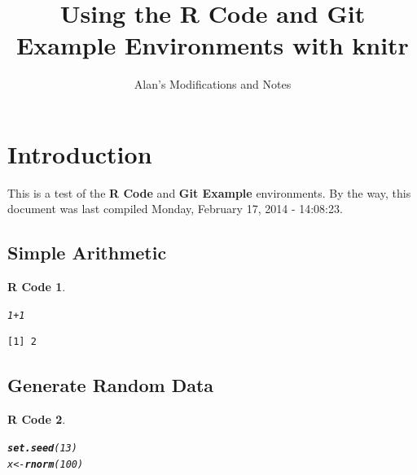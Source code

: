 \documentclass{article}\usepackage[]{graphicx}\usepackage[]{color}
\title{Using the \textbf{R Code} and {\bfseries{Git Example}} Environments with \textbf{knitr}}
\author{Alan's Modifications and Notes}
\makeatletter
\newcommand{\hlnum}[1]{\textcolor[rgb]{0.686,0.059,0.569}{#1}}%
\newcommand{\hlopt}[1]{\textcolor[rgb]{0,0,0}{#1}}%
\newcommand{\hlstd}[1]{\textcolor[rgb]{0.345,0.345,0.345}{#1}}%
\newcommand{\hlkwb}[1]{\textcolor[rgb]{0.69,0.353,0.396}{#1}}%
\newcommand{\hlkwd}[1]{\textcolor[rgb]{0.737,0.353,0.396}{\textbf{#1}}}%
\newenvironment{kframe}{%
 \def\at@end@of@kframe{}%
 \ifinner\ifhmode%
  \def\at@end@of@kframe{\end{minipage}}%
  \begin{minipage}{\columnwidth}%
 \fi\fi%
 \def\FrameCommand##1{\hskip\@totalleftmargin \hskip-\fboxsep
 \colorbox{shadecolor}{##1}\hskip-\fboxsep
     \hskip-\linewidth \hskip-\@totalleftmargin \hskip\columnwidth}%
 \MakeFramed {\advance\hsize-\width
   \@totalleftmargin\z@ \linewidth\hsize
   \@setminipage}}%
 {\par\unskip\endMakeFramed%
 \at@end@of@kframe}
\newenvironment{knitrout}{}{} %
\theoremstyle{rcode}
\newtheorem{rcode}{R Code}[section]
\makeatother
\begin{document}
\maketitle





\section{Introduction}

This is a test of the \textbf{R Code} and \textbf{Git Example} environments.  By the way,
this document was last compiled Monday, February 17, 2014 - 14:08:23.

\subsection{Simple Arithmetic}

\begin{knitrout}
\color{fgcolor}\begin{kframe}
\begin{rcode}\label{test-a}\hfill{}\begin{alltt}
\hlnum{1} \hlopt{+} \hlnum{1}
\end{alltt}
\begin{verbatim}
[1] 2
\end{verbatim}
\end{rcode}\end{kframe}
\end{knitrout}



\subsection{Generate Random Data}

\begin{knitrout}
\color{fgcolor}\begin{kframe}
\begin{rcode}\label{test-b}\hfill{}\begin{alltt}
\hlkwd{set.seed}\hlstd{(}\hlnum{13}\hlstd{)}
\hlstd{x} \hlkwb{<-} \hlkwd{rnorm}\hlstd{(}\hlnum{100}\hlstd{)}
\end{alltt}
\end{rcode}\end{kframe}
\end{knitrout}
\end{document}

